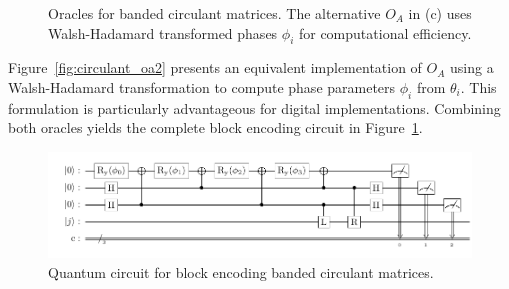 \documentclass{article}
\begin{document}
\begin{figure}[htbp]
  \centering
  \caption{Oracles for banded circulant matrices. The alternative $O_A$ in (c) uses Walsh-Hadamard transformed phases $\phi_i$ for computational efficiency.}
\end{figure}

Figure~\ref{fig:circulant_oa2} presents an equivalent implementation of $O_A$ using a Walsh-Hadamard transformation to compute phase parameters $\phi_i$ from $\theta_i$. This formulation is particularly advantageous for digital implementations. Combining both oracles yields the complete block encoding circuit in Figure~\ref{fig:circulant_circuit}.

\begin{figure}[htbp]
  \centering
  \includegraphics{pdf/circulant_circuit}
  \caption{Quantum circuit for block encoding banded circulant matrices.}
  \label{fig:circulant_circuit}
\end{figure}
\end{document}
